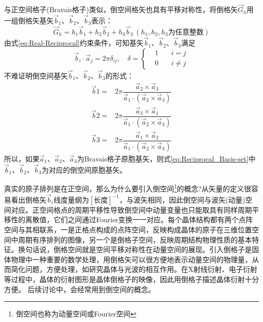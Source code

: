 与正空间格子(Bravais格子)类似，倒空间格矢也具有平移对称性，将倒格矢$\vec G_h$用一组倒格矢基矢$\vec b_1$、$\vec b_2$、$\vec b_3$表示：
\begin{equation}
	\vec G_h=h_1\vec b_1+h_2\vec b_2+h_3\vec b_3~(h_1,h_2,h_3\mbox{为任意整数})
	\label{eq:Reciprocal-vector}
\end{equation}
由式\eqref{eq:Real-Reciprocal}约束条件，可知基矢$\vec b_1$、$\vec b_2$、$\vec b_3$满足
\begin{equation}
	\vec b_i\cdot\vec a_j=2\pi\delta_{ij},\quad\delta=
	\left\{\begin{aligned}
		&1 \quad &i=j\\
		&0 \quad &i\neq j
	\end{aligned}\right.
	\label{eq:Real_Reciprocal-Basis_set}
\end{equation} 
不难证明倒空间基矢$\vec b_1$、$\vec b_2$、$\vec b_3$的形式：
\begin{equation}
	\begin{aligned}
		\vec b1=&2\pi\dfrac{\vec a_2\times\vec a_3}{\vec a_1\cdot(\vec a_2\times\vec a_3)}\\
		\vec b2=&2\pi\dfrac{\vec a_3\times\vec a_1}{\vec a_1\cdot(\vec a_2\times\vec a_3)}\\
		\vec b3=&2\pi\dfrac{\vec a_1\times\vec a_2}{\vec a_1\cdot(\vec a_2\times\vec a_3)}
	\end{aligned}
	\label{eq:Reciprocal_Basis-set}
\end{equation} 
所以，如果$\vec a_1$、$\vec a_2$、$\vec a_3$为Bravais格子原胞基矢，则式\eqref{eq:Reciprocal_Basis-set}中$\vec b_1$、$\vec b_2$、$\vec b_3$为对应的倒空间原胞基矢。

真实的原子排列是在正空间，那么为什么要引入倒空间\footnote{倒空间也称为动量空间或Fourier空间}的概念?从矢量的定义很容易看出倒格矢$\vec b_i$线度量纲为$[\mbox{长度}]^{-1}$，与波矢相同，因此倒空间与波矢(动量)空间对应。正空间格点的周期平移性导致倒空间中动量变量也只能取具有同样周期平移性的离散值，它们之间通过Fourier变换一一对应。每个晶体结构都有两个点阵空间与其相联系，一是正格点构成的点阵空间，反映构成晶体的原子在三维位置空间中周期有序排列的图像，另一个是倒格子空间，反映周期结构物理性质的基本特征。换句话说，倒格空间就是空间平移对称性在动量空间的展现。引入倒格子是固体物理中一种重要的数学处理，用倒格矢可以很方便地表示动量空间的物理量，从而简化问题，方便处理，如研究晶体与光波的相互作用。在X射线衍射、电子衍射等过程中，晶体的衍射图形是晶体倒格子的映像，因此用倒格子描述晶体衍射十分方便。%
后续讨论中，会经常用到倒空间的概念。

